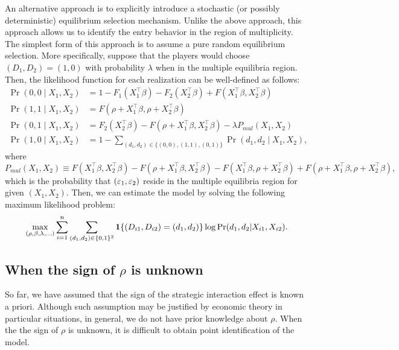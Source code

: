 \documentclass[11pt, A4paper, openany, uplatex]{book}
\begin{document}
An alternative approach is to explicitly introduce a stochastic (or possibly deterministic) equilibrium selection mechanism. 
Unlike the above approach, this approach allows us to identify the entry behavior in the region of multiplicity.
The simplest form of this approach is to assume a pure random equilibrium selection.
More specifically, suppose that the players would choose $(D_1, D_2) = (1,0)$ with probability $\lambda$ when in the multiple equilibria region.
Then, the likelihood function for each realization can be well-defined as follows:
\begin{align*}
	\Pr(0, 0 \mid X_1, X_2) 
	& = 1 - F_1(X_1^\top\beta) - F_2(X_2^\top\beta) + F(X_1^\top\beta, X_2^\top\beta)  \\
	\Pr(1, 1 \mid X_1, X_2) 
	& = F(\rho + X_1^\top\beta, \rho + X_2^\top\beta) \\
	\Pr(0, 1 \mid X_1, X_2) 
	& = F_2( X_2^\top\beta) - F(\rho + X_1^\top\beta, X_2^\top\beta) - \lambda P_{mul}(X_1, X_2) \\
	\Pr(1, 0 \mid X_1, X_2)
	& = 1 - \sum_{(d_1, d_2) \in \{(0,0), (1,1), (0,1)\}}\Pr( d_1, d_2 \mid X_1, X_2), 
\end{align*}
where
\[
	P_{mul}(X_1, X_2) \equiv F(X_1^\top\beta, X_2^\top\beta)  - F(\rho + X_1^\top\beta, X_2^\top\beta) - F(X_1^\top\beta, \rho + X_2^\top\beta) +   F(\rho + X_1^\top\beta, \rho + X_2^\top\beta) ,
\]
which is the probability that $(\varepsilon_1, \varepsilon_2)$ reside in the multiple equilibria region for given $(X_1, X_2)$.
Then, we can estimate the model by solving the following maximum likelihood problem:
\[
	\max_{(\rho, \beta, \lambda, \ldots)} \sum_{i = 1}^n \sum_{(d_1, d_2) \in \{0,1\}^2} \mathbf{1}\{(D_{i1}, D_{i2}) = (d_1, d_2) \} \log \Pr( d_1, d_2 | X_{i1}, X_{i2}).
\]

\subsection{When the sign of $\rho$ is unknown}

So far, we have assumed that the sign of the strategic interaction effect is known a priori.
Although such assumption may be justified by economic theory in particular situations, in general, we do not have prior knowledge about $\rho$.
When the the sign of $\rho$ is unknown, it is difficult to obtain point identification of the model.
\end{document}
